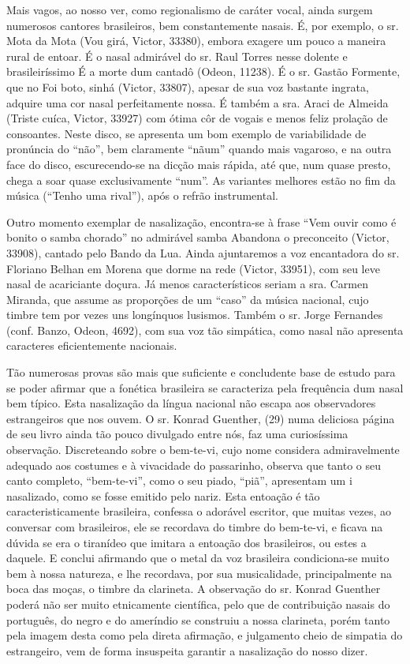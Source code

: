 Mais vagos, ao nosso ver, como regionalismo de caráter vocal, ainda
surgem numerosos cantores brasileiros, bem constantemente nasais. É, por
exemplo, o sr. Mota da Mota (Vou girá, Victor, 33380), embora exagere um
pouco a maneira rural de entoar. É o nasal admirável do sr. Raul Torres
nesse dolente e brasileiríssimo É a morte dum cantadô (Odeon, 11238). É
o sr. Gastão Formente, que no Foi boto, sinhá (Victor, 33807), apesar de
sua voz bastante ingrata, adquire uma cor nasal perfeitamente nossa. É
também a sra. Araci de Almeida (Triste cuíca, Victor, 33927) com ótima
côr de vogais e menos feliz prolação de consoantes. Neste disco, se
apresenta um bom exemplo de variabilidade de pronúncia do ``não'', bem
claramente ``nãum'' quando mais vagaroso, e na outra face do disco,
escurecendo-se na dicção mais rápida, até que, num quase presto, chega a
soar quase exclusivamente ``num''. As variantes melhores estão no fim da
música (``Tenho uma rival''), após o refrão instrumental.

Outro momento exemplar de nasalização, encontra-se à frase ``Vem ouvir
como é bonito o samba chorado'' no admirável samba Abandona o
preconceito (Victor, 33908), cantado pelo Bando da Lua. Ainda
ajuntaremos a voz encantadora do sr. Floriano Belhan em Morena que dorme
na rede (Victor, 33951), com seu leve nasal de acariciante doçura. Já
menos característicos seriam a sra. Carmen Miranda, que assume as
proporções de um ``caso'' da música nacional, cujo timbre tem por vezes
uns longínquos lusismos. Também o sr. Jorge Fernandes (conf. Banzo,
Odeon, 4692), com sua voz tão simpática, como nasal não apresenta
caracteres eficientemente nacionais.

Tão numerosas provas são mais que suficiente e concludente base de
estudo para se poder afirmar que a fonética brasileira se caracteriza
pela frequência dum nasal bem típico. Esta nasalização da língua
nacional não escapa aos observadores estrangeiros que nos ouvem. O sr.
Konrad Guenther, (29) numa deliciosa página de seu livro ainda tão pouco
divulgado entre nós, faz uma curiosíssima observação. Discreteando sobre
o bem-te-vi, cujo nome considera admiravelmente adequado aos costumes e
à vivacidade do passarinho, observa que tanto o seu canto completo,
``bem-te-vi'', como o seu piado, ``piã'', apresentam um i nasalizado,
como se fosse emitido pelo nariz. Esta entoação é tão
caracteristicamente brasileira, confessa o adorável escritor, que muitas
vezes, ao conversar com brasileiros, ele se recordava do timbre do
bem-te-vi, e ficava na dúvida se era o tiranídeo que imitara a entoação
dos brasileiros, ou estes a daquele. E conclui afirmando que o metal da
voz brasileira condiciona-se muito bem à nossa natureza, e lhe
recordava, por sua musicalidade, principalmente na boca das moças, o
timbre da clarineta. A observação do sr. Konrad Guenther poderá não ser
muito etnicamente científica, pelo que de contribuição nasais do
português, do negro e do ameríndio se construiu a nossa clarineta, porém
tanto pela imagem desta como pela direta afirmação, e julgamento cheio
de simpatia do estrangeiro, vem de forma insuspeita garantir a
nasalização do nosso dizer.


